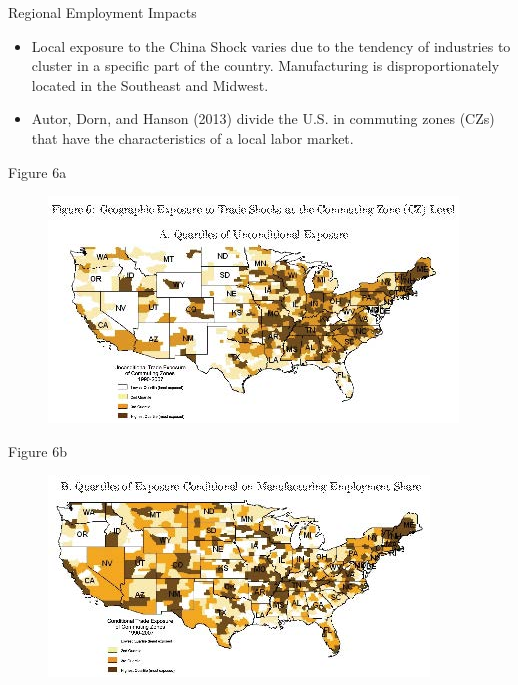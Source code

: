 \documentclass[aspectratio=169]{beamer}
\begin{document}

\begin{frame}{Regional Employment Impacts}

\begin{itemize}
    \item<1-> Local exposure to the China Shock varies due to the tendency of industries to cluster in a specific part of the country.  Manufacturing is disproportionately located in the Southeast and Midwest.
    \item<2-> Autor, Dorn, and Hanson (2013) divide the U.S. in commuting zones (CZs) that have the characteristics of a local labor market.
\end{itemize}
    
\end{frame}


\begin{frame}{Figure 6a}

\begin{figure}
    \centering
    \includegraphics[scale=0.85]{AutorDornHansonFig6a.jpg}
    \label{fig:Fig6a}
\end{figure}
    
\end{frame}


\begin{frame}{Figure 6b}

\begin{figure}
    \centering
    \includegraphics[scale=0.85]{AutorDornHansonFig6b.jpg}
    \label{fig:Fig6b}
\end{figure}
    
\end{frame}
\end{document}
